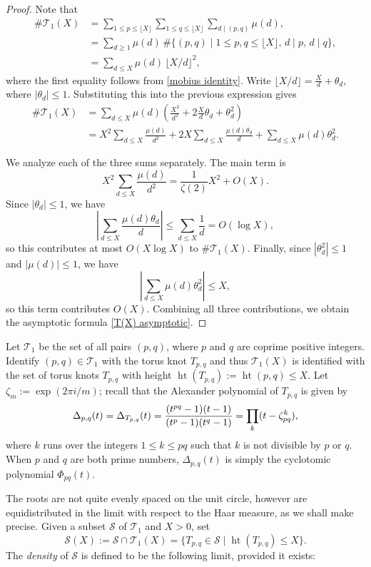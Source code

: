 \documentclass[table]{amsart}
\newcommand{\op}[1]{\operatorname{#1}}
\numberwithin{equation}{section}
\begin{document}
\begin{proof} Note that 
\[\begin{split}
\#\mathcal{T}_1(X)
&= \sum_{1\leq p\leq \lfloor X\rfloor } \sum_{1\leq q \leq \lfloor X\rfloor } \sum_{d\mid(p,q)} \mu(d),\\
&= \sum_{d\ge 1} \mu(d)\, \#\{(p,q)\mid 1\le p,q\le \lfloor X\rfloor,\, d\mid p,\, d\mid q\},\\
&=\sum_{d\le X} \mu(d)\, \lfloor X/d \rfloor^2,
\end{split}
\]
where the first equality follows from \eqref{mobius identity}. Write $\lfloor X/d \rfloor = \frac{X}{d} + \theta_d$, where $|\theta_d|\le 1$. Substituting this into the previous expression gives
\begin{align*}
\#\mathcal{T}_1(X)
&= \sum_{d\le X} \mu(d) \left(\frac{X^2}{d^2} + 2\frac{X}{d}\theta_d + \theta_d^2 \right) \\
&= X^2 \sum_{d\le X} \frac{\mu(d)}{d^2}
  + 2X\sum_{d\le X}\frac{\mu(d)\theta_d}{d}
  + \sum_{d\le X}\mu(d)\theta_d^2.
\end{align*}

We analyze each of the three sums separately. The main term is
\[
X^2 \sum_{d\le X}\frac{\mu(d)}{d^2} = \frac{1}{\zeta(2)}X^2 + O(X).
\]
\noindent Since $|\theta_d|\le 1$, we have
\[
\left|\sum_{d\le X}\frac{\mu(d)\theta_d}{d}\right| \le \sum_{d\le X}\frac{1}{d} = O(\log X),
\]
so this contributes at most $O(X\log X)$ to $\#\mathcal{T}_1(X)$. Finally, since $|\theta_d^2|\le 1$ and $|\mu(d)|\le 1$, we have
\[
\left|\sum_{d\le X}\mu(d)\theta_d^2\right|\le X,
\]
so this term contributes $O(X)$. Combining all three contributions, we obtain the asymptotic formula \eqref{T(X) asymptotic}.\end{proof}
Let $\mathcal{T}_1$ be the set of all pairs $(p,q)$, where $p$ and $q$ are coprime positive integers. Identify $(p, q)\in \mathcal{T}_1$ with the torus knot $T_{p, q}$ and thus $\mathcal{T}_1(X)$ is identified with the set of torus knots $T_{p,q}$ with height $\op{ht}(T_{p,q}):=\op{ht}(p,q)\leq X$. Let $\zeta_{m}:=\op{exp}(2\pi i /m)$; recall that the Alexander polynomial of $T_{p,q}$ is given by 
\begin{equation}\label{Delta_{p,q}(t) formula}\Delta_{p,q}(t)=\Delta_{T_{p, q}}(t)=\frac{(t^{pq}-1)(t-1)}{(t^p-1)(t^q-1)}=\prod_{k} (t-\zeta_{pq}^k),\end{equation} where $k$ runs over the integers $1\leq k\leq {pq}$ such that $k$ is not divisible by $p$ or $q$. When $p$ and $q$ are both prime numbers, $\Delta_{p,q}(t)$ is simply the cyclotomic polynomial $\Phi_{pq}(t)$. \par The roots are not quite evenly spaced on the unit circle, however are equidistributed in the limit with respect to the Haar measure, as we shall make precise. Given a subset $\mathcal{S}$ of $\mathcal{T}_1$ and $X>0$, set \[\mathcal{S}(X):=\mathcal{S}\cap \mathcal{T}_1(X)=\{T_{p, q}\in \mathcal{S}\mid \op{ht} (T_{p, q})\leq X\}.\] The \emph{density} of $\mathcal{S}$ is defined to be the following limit, provided it exists:
\end{document}
